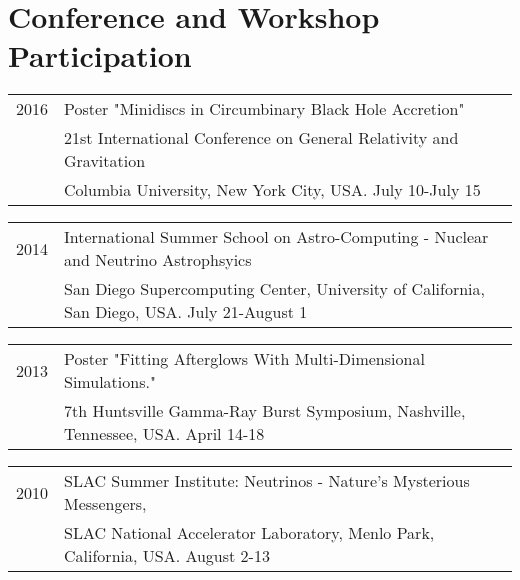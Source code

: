 \documentclass[letterpaper]{article}
\renewenvironment{itemize}{
  \begin{list}{}{
    \setlength{\leftmargin}{1.5em}
  }
}{
  \end{list}
}
\begin{document}
\section*{Conference and Workshop Participation}
\begin{itemize}
\item \begin{tabular}{ll}
2016 & Poster "Minidiscs in Circumbinary Black Hole Accretion" \\
	& 21st International Conference on General Relativity and Gravitation \\ 
	& Columbia University, New York City, USA. July 10-July 15
\end{tabular}

\item \begin{tabular}{ll}
2014 & International Summer School on Astro-Computing - Nuclear and Neutrino Astrophsyics \\ 
	& San Diego Supercomputing Center, University of California, San Diego, USA. July 21-August 1
\end{tabular}

\item \begin{tabular}{ll}
2013 & Poster "Fitting Afterglows With Multi-Dimensional Simulations." \\ 
	&7th Huntsville Gamma-Ray Burst Symposium, Nashville, Tennessee, USA.  April 14-18 \\
\end{tabular}

\item \begin{tabular}{ll}
2010 & SLAC Summer Institute: Neutrinos - Nature's Mysterious Messengers, \\ 
	 & SLAC National Accelerator Laboratory, Menlo Park, California, USA.  August 2-13\\
\end{tabular}
\end{itemize}


\end{document}
